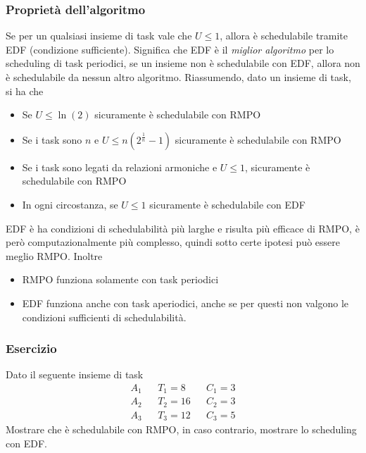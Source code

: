 \documentclass[10pt, letterpaper]{report}
\begin{document}
\subsubsection{Proprietà dell'algoritmo}
\prop{} Se per un qualsiasi insieme di task vale che $U\le 1$, allora 
è schedulabile tramite EDF (condizione sufficiente). Significa che 
EDF è il \textit{miglior algoritmo} per lo scheduling di task periodici, 
se un insieme non è schedulabile con EDF, allora non è 
schedulabile da nessun altro algoritmo.\acc 
Riassumendo, dato un insieme di task, si ha che
\begin{itemize}
    \item Se $U\le \ln(2)$ sicuramente è schedulabile con RMPO 
    \item Se i task sono $n$ e $U\le n(2^{\frac{1}{n}}-1)$ sicuramente è schedulabile con RMPO 
    \item Se i task sono legati da relazioni armoniche e 
    $U\le 1$, sicuramente è schedulabile con RMPO 
    \item In ogni circostanza, se $U\le 1$ sicuramente è schedulabile con EDF 
\end{itemize}
EDF è ha condizioni di schedulabilità più larghe e risulta 
più efficace di RMPO, è però computazionalmente più complesso, quindi 
sotto certe ipotesi può essere meglio RMPO. Inoltre\begin{itemize}
    \item RMPO funziona solamente con task periodici 
    \item EDF funziona anche con task aperiodici, anche se 
    per questi non valgono le condizioni sufficienti di schedulabilità.
\end{itemize}
\subsubsection{Esercizio}
Dato il seguente insieme di task 
$$ \begin{matrix}
    A_1&&T_1=8&&C_1=3\\ 
    A_2&&T_2=16&&C_2=3\\ 
    A_3&&T_3=12&&C_3=5
\end{matrix} $$
Mostrare che è schedulabile con RMPO, in caso contrario, 
mostrare lo scheduling con EDF. 
\end{document}
